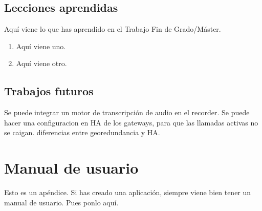 \documentclass[a4paper, 12pt]{book}
\begin{document}
\section{Lecciones aprendidas}
\label{sec:lecciones_aprendidas}

Aquí viene lo que has aprendido en el Trabajo Fin de Grado/Máster.

\begin{enumerate}
  \item Aquí viene uno.
  \item Aquí viene otro.
\end{enumerate}


\section{Trabajos futuros}
\label{sec:trabajos_futuros}

Se puede integrar un motor de transcripción de audio en el recorder.
Se puede hacer una configuracion en HA de los gateways, para que las llamadas activas no se caigan. diferencias entre georedundancia y HA.



\cleardoublepage
\appendix
\chapter{Manual de usuario}
\label{app:manual}

Esto es un apéndice.
Si has creado una aplicación, siempre viene bien tener un manual de usuario.
Pues ponlo aquí.


\cleardoublepage


\end{document}
